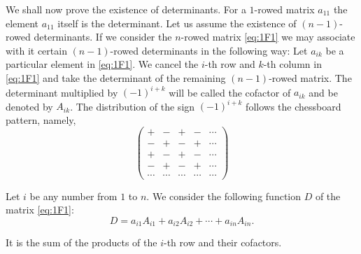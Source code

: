 \documentclass[10pt,leqno]{article}
\theoremstyle{definition}
\begin{document}
We shall now prove the existence of determinants.
For a $1$-rowed matrix $a_{11}$ the element $a_{11}$ itself is the determinant.
Let us assume the existence of $(n-1)$-rowed determinants.
If we consider the $n$-rowed matrix \eqref{eq:1F1} we may associate with it certain $(n-1)$-rowed determinants in the following way:
Let $a_{ik}$ be a particular element in \eqref{eq:1F1}.
We cancel the $i$-th row and $k$-th column in \eqref{eq:1F1} and take the determinant of the remaining $(n-1)$-rowed matrix.
The determinant multiplied by $(-1)^{i+k}$ will be called the cofactor of $a_{ik}$ and be denoted by $A_{ik}$.
The distribution of the sign $(-1)^{i+k}$ follows the chessboard pattern, namely,
\[
\begin{pmatrix}
+ & - & + & - & \cdots
\\
- & + & - & + & \cdots
\\
+ & - & + & - & \cdots
\\
- & + & - & + & \cdots
\\
\cdots & \cdots & \cdots & \cdots & \cdots
\end{pmatrix}
\]

Let $i$ be any number from $1$ to $n$.
We consider the following function $D$ of the matrix \eqref{eq:1F1}:
\begin{equation}
\label{eq:13}
D = a_{i1} A_{i1} + a_{i2} A_{i2} + \cdots + a_{in} A_{in}.
\end{equation}

It is the sum of the products of the $i$-th row and their cofactors.
\end{document}

